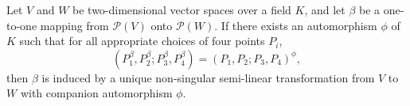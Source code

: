 Let $V$ and $W$ be two-dimensional vector spaces over a field $K$, and let $\beta$ be a one-to-one mapping from $\mathcal{P}(V)$ onto $\mathcal{P}(W)$. If there exists an automorphism $\phi$ of $K$ such that for all appropriate choices of four points $P_i$,
$$(P_1^\beta, P_2^\beta; P_3^\beta, P_4^\beta) = (P_1, P_2; P_3, P_4)^\phi,$$
then $\beta$ is induced by a unique non-singular semi-linear transformation from $V$ to $W$ with companion automorphism $\phi$.